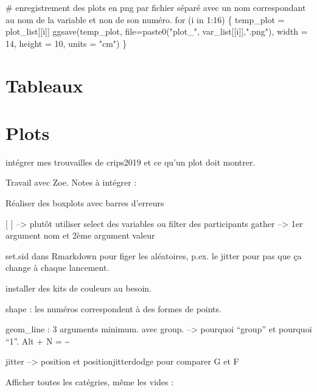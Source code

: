\documentclass[
  letterpaper,
  DIV=11,
  numbers=noendperiod]{scrreprt}
\newenvironment{Shaded}{\begin{snugshade}}{\end{snugshade}}
\newcommand{\AttributeTok}[1]{\textcolor[rgb]{0.40,0.45,0.13}{#1}}
\newcommand{\CommentTok}[1]{\textcolor[rgb]{0.37,0.37,0.37}{#1}}
\newcommand{\ControlFlowTok}[1]{\textcolor[rgb]{0.00,0.23,0.31}{#1}}
\newcommand{\DecValTok}[1]{\textcolor[rgb]{0.68,0.00,0.00}{#1}}
\newcommand{\FunctionTok}[1]{\textcolor[rgb]{0.28,0.35,0.67}{#1}}
\newcommand{\NormalTok}[1]{\textcolor[rgb]{0.00,0.23,0.31}{#1}}
\newcommand{\OtherTok}[1]{\textcolor[rgb]{0.00,0.23,0.31}{#1}}
\newcommand{\SpecialCharTok}[1]{\textcolor[rgb]{0.37,0.37,0.37}{#1}}
\newcommand{\StringTok}[1]{\textcolor[rgb]{0.13,0.47,0.30}{#1}}
\begin{document}
\begin{Shaded}
\begin{Highlighting}[]
\CommentTok{\# enregistrement des plots en png par fichier séparé avec un nom correspondant au nom de la variable et non de son numéro.}
\ControlFlowTok{for}\NormalTok{ (i }\ControlFlowTok{in} \DecValTok{1}\SpecialCharTok{:}\DecValTok{16}\NormalTok{) \{}
\NormalTok{  temp\_plot }\OtherTok{=}\NormalTok{ plot\_list[[i]]}
  \FunctionTok{ggsave}\NormalTok{(temp\_plot, }\AttributeTok{file=}\FunctionTok{paste0}\NormalTok{(}\StringTok{"plot\_"}\NormalTok{, var\_list[[i]],}\StringTok{".png"}\NormalTok{), }\AttributeTok{width =} \DecValTok{14}\NormalTok{, }\AttributeTok{height =} \DecValTok{10}\NormalTok{, }\AttributeTok{units =} \StringTok{"cm"}\NormalTok{)}
\NormalTok{\}}
\end{Highlighting}
\end{Shaded}

\hypertarget{tableaux}{%
\section{Tableaux}\label{tableaux}}

\hypertarget{plots}{%
\section{Plots}\label{plots}}

intégrer mes trouvailles de crips2019 et ce qu'un plot doit montrer.

Travail avec Zoe. Notes à intégrer :

Réaliser des boxplots avec barres d'erreurs

{[} {]} --\textgreater{} plutôt utiliser select des variables ou filter
des participants gather --\textgreater{} 1er argument nom et 2ème
argument valeur

set.sid dans Rmarkdown pour figer les aléatoires, p.ex. le jitter pour
pas que ça change à chaque lancement.

installer des kits de couleurs au besoin.

shape : les numéros correspondent à des formes de points.

geom\_line : 3 arguments minimum. avec group. --\textgreater{} pourquoi
``group'' et pourquoi ``1''. Alt + N = \textasciitilde{}

jitter --\textgreater{} position et positionjitterdodge pour comparer G
et F

Afficher toutes les catégries, même les vides :
\end{document}

